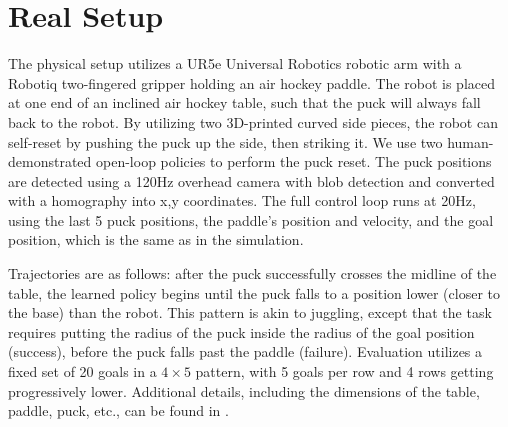 \section{Real Setup}
\label{app:real_setup}
The physical setup utilizes a UR5e Universal Robotics robotic arm with a Robotiq two-fingered gripper holding an air hockey paddle. The robot is placed at one end of an inclined air hockey table, such that the puck will always fall back to the robot. By utilizing two 3D-printed curved side pieces, the robot can self-reset by pushing the puck up the side, then striking it. We use two human-demonstrated open-loop policies to perform the puck reset. The puck positions are detected using a 120Hz overhead camera with blob detection and converted with a homography into x,y coordinates. The full control loop runs at 20Hz, using the last 5 puck positions, the paddle's position and velocity, and the goal position, which is the same as in the simulation.


Trajectories are as follows: after the puck successfully crosses the midline of the table, the learned policy begins until the puck falls to a position lower (closer to the base) than the robot. This pattern is akin to juggling, except that the task requires putting the radius of the puck inside the radius of the goal position (success), before the puck falls past the paddle (failure). Evaluation utilizes a fixed set of 20 goals in a $4\times5$ pattern, with 5 goals per row and 4 rows getting progressively lower. Additional details, including the dimensions of the table, paddle, puck, etc., can be found in \citet{chuck2024robot}.

